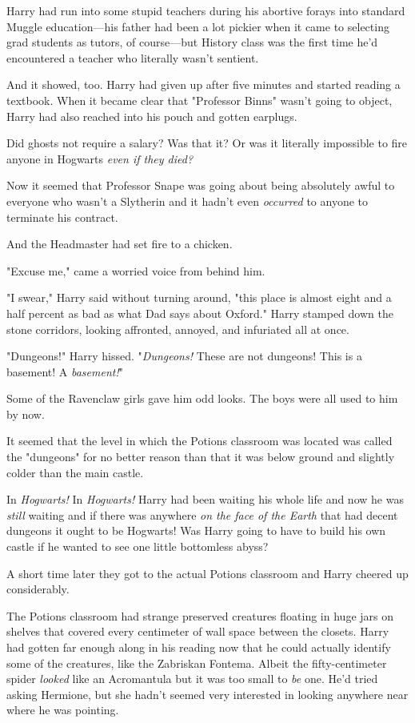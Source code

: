 Harry had run into some stupid teachers during his abortive forays into
standard Muggle education---his father had been a lot pickier when it came to
selecting grad students as tutors, of course---but History class was the first
time he'd encountered a teacher who literally wasn't sentient.

And it showed, too. Harry had given up after five minutes and started reading a
textbook. When it became clear that "Professor Binns" wasn't going to object,
Harry had also reached into his pouch and gotten earplugs.

Did ghosts not require a salary? Was that it? Or was it literally impossible to
fire anyone in Hogwarts \emph{even if they died?}

Now it seemed that Professor Snape was going about being absolutely awful to
everyone who wasn't a Slytherin and it hadn't even \emph{occurred} to anyone to
terminate his contract.

And the Headmaster had set fire to a chicken.

"Excuse me," came a worried voice from behind him.

"I swear," Harry said without turning around, "this place is almost eight and a
half percent as bad as what Dad says about Oxford."
\sbreak
Harry stamped down the stone corridors, looking affronted, annoyed, and
infuriated all at once.

"Dungeons!" Harry hissed. "\emph{Dungeons!}  These are not dungeons! This is a
basement! A \emph{basement!}"

Some of the Ravenclaw girls gave him odd looks. The boys were all used to him
by now.

It seemed that the level in which the Potions classroom was located was called
the "dungeons" for no better reason than that it was below ground and slightly
colder than the main castle.

In \emph{Hogwarts!} In \emph{Hogwarts!} Harry had been waiting his whole life
and now he was \emph{still} waiting and if there was anywhere \emph{on the face
of the Earth} that had decent dungeons it ought to be Hogwarts! Was Harry going
to have to build his own castle if he wanted to see one little bottomless abyss?

A short time later they got to the actual Potions classroom and Harry cheered
up considerably.

The Potions classroom had strange preserved creatures floating in huge jars on
shelves that covered every centimeter of wall space between the closets. Harry
had gotten far enough along in his reading now that he could actually identify
some of the creatures, like the Zabriskan Fontema. Albeit the fifty-centimeter
spider \emph{looked} like an Acromantula but it was too small to \emph{be} one.
He'd tried asking Hermione, but she hadn't seemed very interested in looking
anywhere near where he was pointing.

